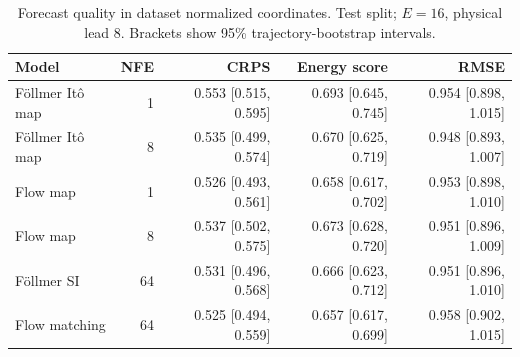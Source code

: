 \begin{table}[t]
\centering
\small
\setlength{\tabcolsep}{3pt}
\caption{Forecast quality in dataset normalized coordinates. Test split; $E=16$, physical lead 8. Brackets show 95\% trajectory-bootstrap intervals.}
\label{tab:map-quality}
\begin{tabular}{lrrrr}
\toprule
Model & NFE & CRPS & Energy score & RMSE \\
\midrule
Föllmer Itô map & 1 & 0.553 [0.515, 0.595] & 0.693 [0.645, 0.745] & 0.954 [0.898, 1.015] \\
Föllmer Itô map & 8 & 0.535 [0.499, 0.574] & 0.670 [0.625, 0.719] & 0.948 [0.893, 1.007] \\
\addlinespace
Flow map & 1 & 0.526 [0.493, 0.561] & 0.658 [0.617, 0.702] & 0.953 [0.898, 1.010] \\
Flow map & 8 & 0.537 [0.502, 0.575] & 0.673 [0.628, 0.720] & 0.951 [0.896, 1.009] \\
\addlinespace
Föllmer SI & 64 & 0.531 [0.496, 0.568] & 0.666 [0.623, 0.712] & 0.951 [0.896, 1.010] \\
\addlinespace
Flow matching & 64 & 0.525 [0.494, 0.559] & 0.657 [0.617, 0.699] & 0.958 [0.902, 1.015] \\
\bottomrule
\end{tabular}
\end{table}
